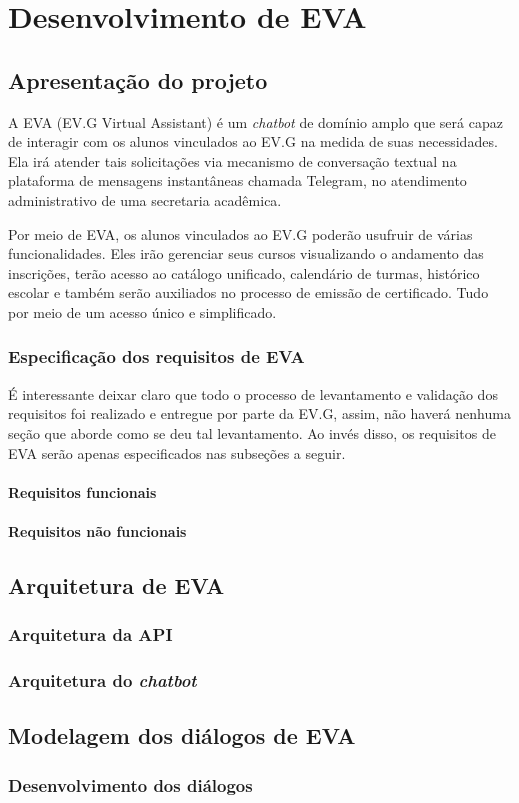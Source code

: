 \chapter{Desenvolvimento de EVA}

\section{Apresentação do projeto}


A EVA (EV.G Virtual Assistant) é um \textit{chatbot} de domínio amplo que será capaz de interagir com os alunos vinculados ao EV.G na medida de suas necessidades.
Ela irá atender tais solicitações via mecanismo de conversação textual na plataforma de mensagens instantâneas chamada Telegram, no atendimento administrativo de uma secretaria acadêmica.

Por meio de EVA, os alunos vinculados ao EV.G poderão usufruir de várias funcionalidades.
Eles irão gerenciar seus cursos visualizando o andamento das inscrições, terão acesso ao catálogo unificado, calendário de turmas, histórico escolar e também serão auxiliados no processo de emissão de certificado. Tudo por meio de um acesso único e simplificado.

\subsection{Especificação dos requisitos de EVA}

É interessante deixar claro que todo o processo de levantamento e validação dos requisitos foi realizado e entregue por parte da EV.G, assim, não haverá nenhuma seção que aborde como se deu tal levantamento. Ao invés disso, os requisitos de EVA serão apenas especificados nas subseções a seguir.

\subsubsection{Requisitos funcionais}

\subsubsection{Requisitos não funcionais}

\section{Arquitetura de EVA}

\subsection{Arquitetura da API}

\subsection{Arquitetura do \textit{chatbot}}

\section{Modelagem dos diálogos de EVA}

\subsection{Desenvolvimento dos diálogos}